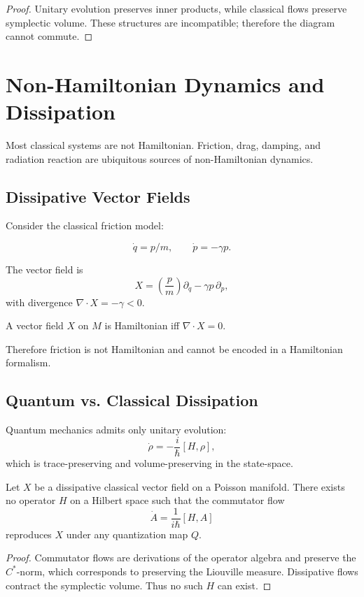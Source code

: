 \documentclass[12pt,oneside]{book}
\begin{document}
\begin{proof}
Unitary evolution preserves inner products, while classical flows preserve symplectic volume.
These structures are incompatible; therefore the diagram cannot commute.
\end{proof}

\chapter{Non-Hamiltonian Dynamics and Dissipation}

Most classical systems are not Hamiltonian.  
Friction, drag, damping, and radiation reaction are ubiquitous sources of non-Hamiltonian dynamics.

\section{Dissipative Vector Fields}

Consider the classical friction model:

\[
\dot q = p/m,\qquad \dot p = -\gamma p.
\]

The vector field is
\[
X = \left(\frac{p}{m}\right)\partial_q - \gamma p\, \partial_p,
\]
with divergence $\nabla\cdot X = -\gamma < 0$.

\begin{theorem}
A vector field $X$ on $M$ is Hamiltonian iff $\nabla\cdot X = 0$.
\end{theorem}

Therefore friction is not Hamiltonian and cannot be encoded in a Hamiltonian formalism.

\section{Quantum vs. Classical Dissipation}

Quantum mechanics admits only unitary evolution:
\[
\dot\rho = -\frac{i}{\hbar}[H,\rho],
\]
which is trace-preserving and volume-preserving in the state-space.

\begin{theorem}
Let $X$ be a dissipative classical vector field on a Poisson manifold.
There exists no operator $H$ on a Hilbert space such that the commutator flow
\[
\dot A = \frac{1}{i\hbar}[H,A]
\]
reproduces $X$ under any quantization map $Q$.
\end{theorem}

\begin{proof}
Commutator flows are derivations of the operator algebra and preserve the $C^*$-norm,
which corresponds to preserving the Liouville measure.
Dissipative flows contract the symplectic volume.  
Thus no such $H$ can exist.
\end{proof}
\end{document}
